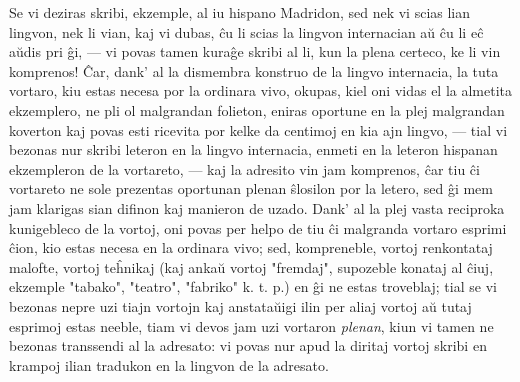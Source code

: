    Se vi deziras skribi, ekzemple, al iu hispano Madridon, sed nek vi
scias lian lingvon, nek li vian, kaj vi dubas, \^cu li scias la
lingvon internacian a\u u \^cu li e\^c a\u udis pri \^gi, --- vi
povas tamen kura\^ge skribi al li, kun la plena certeco, ke li vin
komprenos! \^Car, dank' al la dismembra konstruo de la lingvo
internacia, la tuta vortaro, kiu estas necesa por la ordinara vivo,
okupas, kiel oni vidas el la almetita ekzemplero, ne pli ol
malgrandan folieton, eniras oportune en la plej malgrandan koverton
kaj povas esti ricevita por kelke da centimoj en kia ajn lingvo,
--- tial vi bezonas nur skribi leteron en la lingvo internacia,
enmeti en la leteron hispanan ekzempleron de la vortareto, --- kaj
la adresito vin jam komprenos, \^car tiu \^ci vortareto ne sole
prezentas oportunan plenan \^slosilon por la letero, sed \^gi mem
jam klarigas sian difinon kaj manieron de uzado. Dank' al la plej
vasta reciproka kunigebleco de la vortoj, oni povas per helpo de tiu
\^ci malgranda vortaro esprimi \^cion, kio estas necesa en la
ordinara vivo; sed, kompreneble, vortoj renkontataj malofte, vortoj
te\^hnikaj (kaj anka\u u vortoj "fremdaj", supozeble konataj al
\^ciuj, ekzemple "tabako", "teatro", "fabriko" k. t. p.) en
\^gi ne estas troveblaj; tial se vi bezonas nepre uzi tiajn vortojn
kaj anstata\u uigi ilin per aliaj vortoj a\u u tutaj esprimoj estas
neeble, tiam vi devos jam uzi vortaron {\sl plenan}, kiun vi tamen
ne bezonas transsendi al la adresato: vi povas nur apud la diritaj
vortoj skribi en krampoj ilian tradukon en la lingvon de la
adresato.

